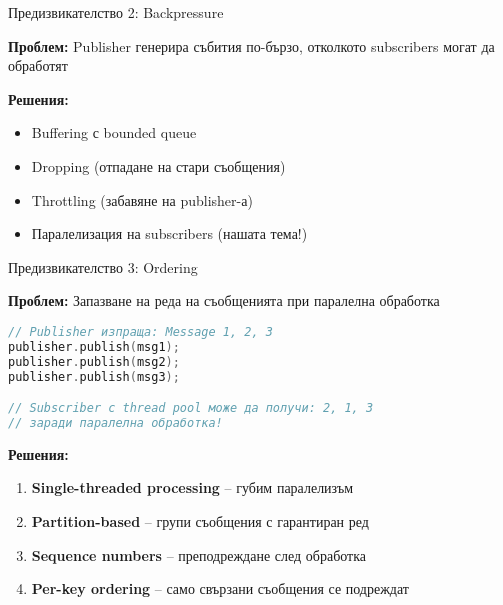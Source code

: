 \documentclass[aspectratio=169]{beamer}
\begin{document}
\begin{frame}{Предизвикателство 2: Backpressure}

\textbf{Проблем:} Publisher генерира събития по-бързо, отколкото subscribers могат да обработят

\begin{center}
\end{center}

\textbf{Решения:}
\begin{itemize}
    \item Buffering с bounded queue
    \item Dropping (отпадане на стари съобщения)
    \item Throttling (забавяне на publisher-а)
    \item Паралелизация на subscribers (нашата тема!)
\end{itemize}
\end{frame}

\begin{frame}{Предизвикателство 3: Ordering}

\textbf{Проблем:} Запазване на реда на съобщенията при паралелна обработка

\begin{lstlisting}[basicstyle=\ttfamily\tiny, language=C++]
// Publisher изпраща: Message 1, 2, 3
publisher.publish(msg1);
publisher.publish(msg2);
publisher.publish(msg3);

// Subscriber с thread pool може да получи: 2, 1, 3
// заради паралелна обработка!
\end{lstlisting}

\textbf{Решения:}
\begin{enumerate}
    \item \textbf{Single-threaded processing} – губим паралелизъм
    \item \textbf{Partition-based} – групи съобщения с гарантиран ред
    \item \textbf{Sequence numbers} – преподреждане след обработка
    \item \textbf{Per-key ordering} – само свързани съобщения се подреждат
\end{enumerate}
\end{frame}
\end{document}
